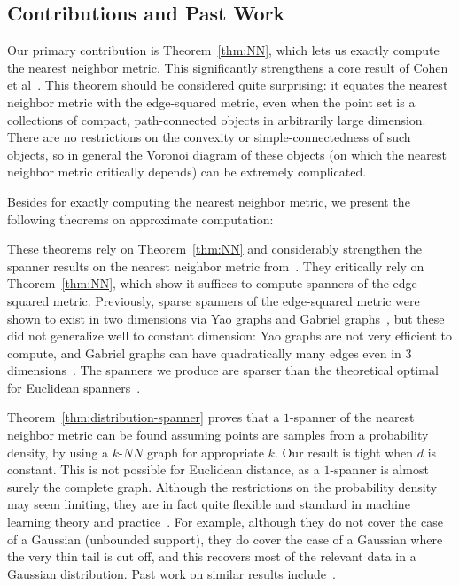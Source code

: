 \subsection{Contributions and Past Work}
Our primary contribution is Theorem~\ref{thm:NN}, which lets us exactly
compute the nearest neighbor metric. This significantly strengthens a core
result of Cohen et al~\cite{cohen15approximating}. This theorem should be considered
quite surprising: it equates the nearest neighbor metric with the
edge-squared metric, even when the point set is a collections of compact,
path-connected objects in arbitrarily large dimension. There are no
restrictions on the convexity or simple-connectedness of such objects, so
in general the Voronoi diagram of these objects (on which the nearest
neighbor metric critically depends) can be extremely complicated.

 Besides for exactly computing the nearest neighbor metric, we present the
following theorems on approximate computation:

 
These theorems rely on Theorem~\ref{thm:NN} and considerably strengthen the
spanner results on the nearest neighbor metric
from~\cite{cohen15approximating}. They critically rely on
Theorem~\ref{thm:NN}, which show it suffices to compute spanners of the
edge-squared metric.
Previously, sparse spanners of the edge-squared metric were shown to exist in two
dimensions via Yao graphs and Gabriel graphs~\cite{LiWan2001}, but these
did not generalize well to constant dimension: Yao
graphs are not very efficient to compute, and Gabriel graphs can have
quadratically many edges even in $3$ dimensions~\cite{chazelle94selecting}.
The spanners we produce are sparser than the
theoretical optimal for Euclidean spanners~\cite{Le19}.

Theorem~\ref{thm:distribution-spanner} proves that a $1$-spanner of
the nearest neighbor metric can be found assuming points are samples from a
probability density, by using a $k$-$NN$ graph for
appropriate $k$. Our result is tight when $d$ is constant. This
is not possible for Euclidean distance, as a $1$-spanner is almost
surely the complete graph. Although the restrictions on the probability
density may seem limiting,
they are in fact quite flexible and standard in
machine learning theory and practice~\cite{hwang2016, alamgir12shortest}. For example, although they do not cover the case
of a Gaussian (unbounded support), they do cover the case of a Gaussian
where the very thin tail is cut off, and this recovers most of the relevant
data in a Gaussian distribution. Past work on similar results
include~\cite{Balister05, Gonzales2003}.

